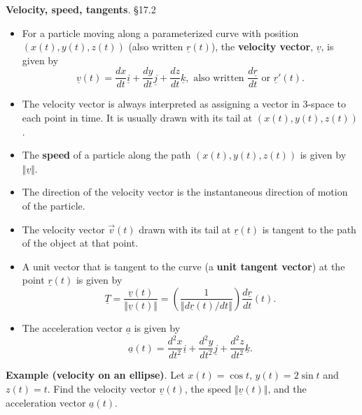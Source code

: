 \documentclass[12pt,letterpaper,noanswers]{exam}
\newcommand{\mb}[1]{\underline{#1}}
\begin{document}
\textbf{Velocity, speed, tangents}.  \S 17.2 
\begin{tcolorbox}
\begin{itemize}
\itemsep0em
    \item For a particle moving along a parameterized curve with position $(x(t),y(t),z(t))$ (also written $\mb r(t)$),
the \textbf{velocity vector}, $\mb v$, is given by \[\mb v(t) = \frac{dx}{dt} \mb i + \frac{dy}{dt}\mb j + \frac{dz}{dt}\mb k, \text{ also written }\frac{d\mb r}{dt}\text{ or }\mb r'(t).\] 
\item The velocity vector is always interpreted as assigning a vector in $3$-space to each point in time.  It is usually drawn with its tail at $(x(t), y(t), z(t))$. 
\item The \textbf{speed} of a particle along the path $(x(t), y(t), z(t))$ is given by $\Vert \mb v \Vert$.
\item The direction of the velocity vector is the instantaneous direction of motion of the particle. 
\item The velocity vector $\vec v(t)$ drawn with its tail at $\mb r(t)$ is tangent to the path of the object at that point.
\end{itemize}
\end{tcolorbox}
\begin{tcolorbox}
\begin{itemize}
\itemsep0em

\item A unit vector that is tangent to the curve (a \textbf{unit tangent vector}) at the point $\mb r(t)$ is given by
\[\mb T = \frac{\mb v(t)}{\Vert \mb v(t) \Vert} = \left(\frac{1}{\left\Vert d\mb r(t)/dt\right\Vert}\right)\frac{d\mb r}{dt}(t).\] 

\item The acceleration vector $\mb a$ is given by
\[\mb a(t) = \frac{d^2x}{dt^2}\mb i + \frac{d^2y}{dt^2}\mb j + \frac{d^2z}{dt^2}\mb k.\]
\end{itemize}
\end{tcolorbox}

\noindent\textbf{Example (velocity on an ellipse)}.   Let $x(t) =  \cos t$, $y(t) = 2\sin t$ and $z(t) = t$.  Find the velocity vector $\mb v(t)$, the speed $\Vert \mb v(t) \Vert$, and the acceleration vector $\mb a(t)$. 
\end{document}
